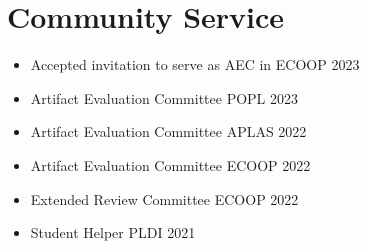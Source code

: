 \section{Community Service}
\begin{itemize}
    \item[\ding{118}] Accepted invitation to serve as AEC in ECOOP 2023
    \item[\ding{118}] Artifact Evaluation Committee POPL 2023
    \item[\ding{118}] Artifact Evaluation Committee APLAS 2022
    \item[\ding{118}] Artifact Evaluation Committee ECOOP 2022
    \item[\ding{118}] Extended Review Committee ECOOP 2022
    \item[\ding{118}] Student Helper PLDI 2021
\end{itemize}
